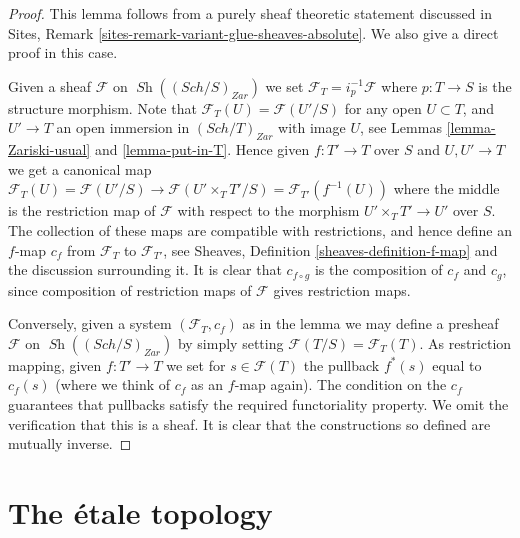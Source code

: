 \documentclass{stacks-project}
\theoremstyle{plain}
\theoremstyle{definition}
\theoremstyle{remark}
\numberwithin{equation}{subsection}
\def\Sch{\mathit{Sch}}
\def\Sh{\mathop{\mathit{Sh}}\nolimits}
\begin{document}
\begin{proof}
This lemma follows from a purely sheaf theoretic statement discussed
in Sites, Remark \ref{sites-remark-variant-glue-sheaves-absolute}.
We also give a direct proof in this case.

\medskip\noindent
Given a sheaf $\mathcal{F}$ on $\Sh((\Sch/S)_{Zar})$
we set $\mathcal{F}_T = i_p^{-1}\mathcal{F}$ where $p : T \to S$
is the structure morphism. Note that
$\mathcal{F}_T(U) = \mathcal{F}(U'/S)$ for any open $U \subset T$,
and $U' \to T$ an open immersion in $(\Sch/T)_{Zar}$
with image $U$, see Lemmas \ref{lemma-Zariski-usual} and \ref{lemma-put-in-T}.
Hence given $f : T' \to T$ over $S$ and $U, U' \to T$ we get a canonical
map $\mathcal{F}_T(U) = \mathcal{F}(U'/S) \to \mathcal{F}(U'\times_T T'/S)
= \mathcal{F}_{T'}(f^{-1}(U))$ where the middle is the restriction map
of $\mathcal{F}$ with respect to the morphism
$U' \times_T T' \to U'$ over $S$. The collection of these maps are
compatible with restrictions, and hence define an $f$-map $c_f$
from $\mathcal{F}_T$ to $\mathcal{F}_{T'}$, see
Sheaves, Definition \ref{sheaves-definition-f-map} and the discussion
surrounding it. It is clear that $c_{f \circ g}$ is the composition of
$c_f$ and $c_g$, since composition of restriction maps of $\mathcal{F}$
gives restriction maps.

\medskip\noindent
Conversely, given a system $(\mathcal{F}_T, c_f)$ as in the lemma
we may define a presheaf $\mathcal{F}$ on $\Sh((\Sch/S)_{Zar})$
by simply setting $\mathcal{F}(T/S) = \mathcal{F}_T(T)$. As restriction
mapping, given $f : T' \to T$ we set for $s \in \mathcal{F}(T)$
the pullback $f^*(s)$ equal to $c_f(s)$ (where we think of $c_f$ as
an $f$-map again). The condition on the $c_f$ guarantees that
pullbacks satisfy the required functoriality property.
We omit the verification that this is a sheaf.
It is clear that the constructions so defined are mutually inverse.
\end{proof}























\section{The \'etale topology}
\label{section-etale}
\end{document}
